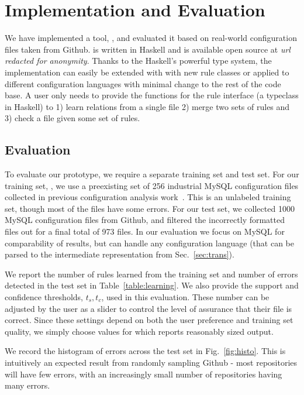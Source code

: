 
\section{Implementation and Evaluation}

We have implemented a tool, \app, and evaluated it based on real-world configuration files taken from Github.
\app is written in Haskell and is available open source at \textit{url redacted for anonymity}.
Thanks to the Haskell's powerful type system, the implementation can easily be extended with with new rule classes or applied to different configuration languages with minimal change to the rest of the code base.
A user only needs to provide the functions for the rule interface (a typeclass in Haskell) to 1) learn relations from a single file 2) merge two sets of rules and 3) check a file given some set of rules.

\subsection{Evaluation}

To evaluate our \app prototype, we require a separate training set and test set. 
For our training set, \trainingSet, we use a preexisting set of 256 
industrial MySQL configuration files collected in previous configuration 
analysis work~\cite{configdataset}.
This is an unlabeled training set, though most of the files have some errors.
For our test set, we collected 1000 MySQL configuration files 
from Github, and filtered the incorrectly formatted files out for a final 
total of 973 files.
In our evaluation we focus on MySQL for comparability of results, but \app can handle any configuration language (that can be parsed to the intermediate representation from Sec.~\ref{sec:trans}).

We report the number of rules learned from the training set and number of errors detected in the test set in Table~\ref{table:learning}.
We also provide the support and confidence thresholds, $t_s, t_c$, used in this evaluation.
These number can be adjusted by the user as a slider to control the level of assurance that their file is correct.
Since these settings depend on both the user preference and training set quality, we simply choose values for which \app reports reasonably sized output.

We record the histogram of errors across the test set in Fig.~\ref{fig:histo}.
This is intuitively an expected result from randomly sampling Github - most repositories will have few errors, with an increasingly small number of repositories having many errors.

